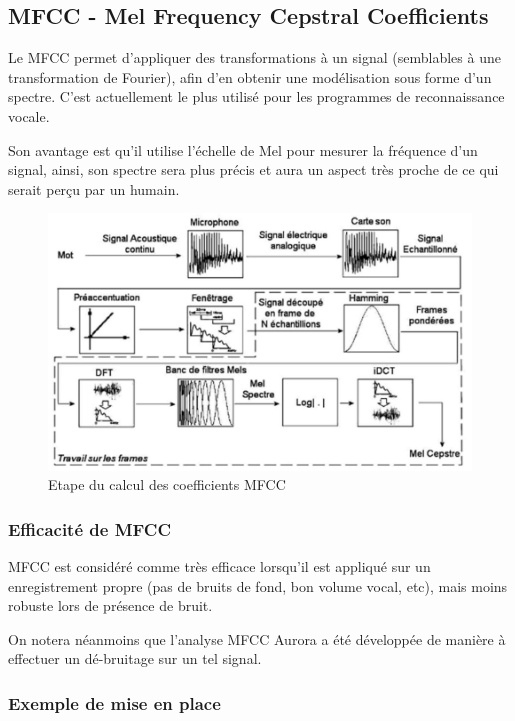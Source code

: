 \documentclass[a4paper, 12pt]{book}
\newcounter{program}[subsection]
\begin{document}
\subsection{MFCC - Mel Frequency Cepstral Coefficients}

Le MFCC permet d’appliquer des transformations à un signal (semblables à une transformation de Fourier), afin d’en obtenir une modélisation sous forme d’un spectre. C’est actuellement le plus utilisé pour les programmes de reconnaissance vocale.

Son avantage est qu’il utilise l’échelle de Mel pour mesurer la fréquence d’un signal, ainsi,
son spectre sera plus précis et aura un aspect très proche de ce qui serait perçu par un humain.

\begin{figure}[htbp]
  \centering
  \includegraphics[width=1\linewidth]{fig/mfcc.png}
  \caption{Etape du calcul des coefficients MFCC}
\end{figure}

\subsubsection{Efficacité de MFCC}

MFCC est considéré comme très efficace lorsqu’il est appliqué sur un enregistrement propre (pas de bruits de fond, bon volume vocal, etc), mais moins robuste lors de présence de bruit.

On notera néanmoins que l’analyse MFCC Aurora a été développée de manière à effectuer un dé-bruitage sur un tel signal.

\subsubsection{Exemple de mise en place}
\end{document}
